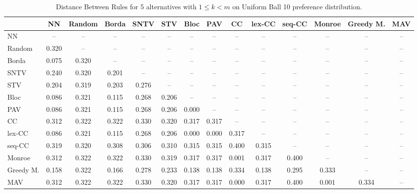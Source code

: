 
\begin{table*}
\centering
\begin{tabular}{lccccccccccccc}
\toprule
 & NN & Random & Borda & SNTV & STV & Bloc & PAV & CC & lex-CC & seq-CC & Monroe & Greedy M. & MAV \\
\midrule
NN & -- & -- & -- & -- & -- & -- & -- & -- & -- & -- & -- & -- & -- \\
Random & 0.320 & -- & -- & -- & -- & -- & -- & -- & -- & -- & -- & -- & -- \\
Borda & 0.075 & 0.320 & -- & -- & -- & -- & -- & -- & -- & -- & -- & -- & -- \\
SNTV & 0.240 & 0.320 & 0.201 & -- & -- & -- & -- & -- & -- & -- & -- & -- & -- \\
STV & 0.204 & 0.319 & 0.203 & 0.276 & -- & -- & -- & -- & -- & -- & -- & -- & -- \\
Bloc & 0.086 & 0.321 & 0.115 & 0.268 & 0.206 & -- & -- & -- & -- & -- & -- & -- & -- \\
PAV & 0.086 & 0.321 & 0.115 & 0.268 & 0.206 & 0.000 & -- & -- & -- & -- & -- & -- & -- \\
CC & 0.312 & 0.322 & 0.322 & 0.330 & 0.320 & 0.317 & 0.317 & -- & -- & -- & -- & -- & -- \\
lex-CC & 0.086 & 0.321 & 0.115 & 0.268 & 0.206 & 0.000 & 0.000 & 0.317 & -- & -- & -- & -- & -- \\
seq-CC & 0.319 & 0.320 & 0.308 & 0.306 & 0.310 & 0.315 & 0.315 & 0.400 & 0.315 & -- & -- & -- & -- \\
Monroe & 0.312 & 0.322 & 0.322 & 0.330 & 0.319 & 0.317 & 0.317 & 0.001 & 0.317 & 0.400 & -- & -- & -- \\
Greedy M. & 0.158 & 0.322 & 0.166 & 0.278 & 0.233 & 0.138 & 0.138 & 0.334 & 0.138 & 0.295 & 0.333 & -- & -- \\
MAV & 0.312 & 0.322 & 0.322 & 0.330 & 0.320 & 0.317 & 0.317 & 0.000 & 0.317 & 0.400 & 0.001 & 0.334 & -- \\
\bottomrule
\end{tabular}

\caption{Distance Between Rules for 5 alternatives with $1 \leq k < m$ on Uniform Ball 10 preference distribution.}
\end{table*}
